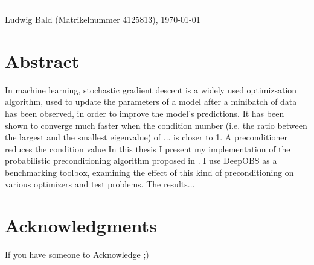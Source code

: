 \vspace*{8ex}
\hrule
\vspace*{2ex}
Ludwig Bald (Matrikelnummer 4125813), \today

\chapter*{Abstract}
In machine learning, stochastic gradient descent is a widely used optimizsation algorithm, used to update the parameters of a model after a minibatch of data has been observed, in order to improve the model's predictions. It has been shown to converge much faster when the condition number (i.e. the ratio between the largest and the smallest eigenvalue) of ... is closer to 1. A preconditioner reduces the condition value 
In this thesis I present my implementation of the probabilistic preconditioning algorithm proposed in \cite{de2019active}. I use DeepOBS  as a benchmarking toolbox, examining the effect of this kind of preconditioning on various optimizers and test problems. 
The results...


\chapter*{Acknowledgments}
If you have someone to Acknowledge ;)


